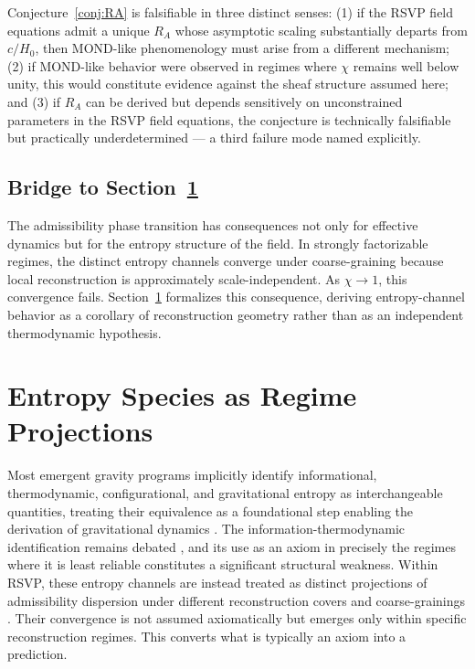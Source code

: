 \documentclass[11pt, a4paper]{article}
\theoremstyle{plain}
\theoremstyle{definition}
\theoremstyle{remark}
\newcommand{\RA}{R_{\!A}}
\begin{document}
Conjecture~\ref{conj:RA} is falsifiable in three distinct senses: (1) if the RSVP
field equations admit a unique $\RA$ whose asymptotic scaling substantially departs
from $c/H_0$, then MOND-like phenomenology must arise from a different mechanism;
(2) if MOND-like behavior were observed in regimes where $\chi$ remains well below
unity, this would constitute evidence against the sheaf structure assumed here; and
(3) if $\RA$ can be derived but depends sensitively on unconstrained parameters in
the RSVP field equations, the conjecture is technically falsifiable but practically
underdetermined --- a third failure mode named explicitly.

\subsection{Bridge to Section~\ref{sec:entropy}}

The admissibility phase transition has consequences not only for effective dynamics
but for the entropy structure of the field. In strongly factorizable regimes, the
distinct entropy channels converge under coarse-graining because local reconstruction
is approximately scale-independent. As $\chi \to 1$, this convergence fails.
Section~\ref{sec:entropy} formalizes this consequence, deriving entropy-channel
behavior as a corollary of reconstruction geometry rather than as an independent
thermodynamic hypothesis.

\section{Entropy Species as Regime Projections}
\label{sec:entropy}

Most emergent gravity programs implicitly identify informational, thermodynamic,
configurational, and gravitational entropy as interchangeable quantities, treating
their equivalence as a foundational step enabling the derivation of gravitational
dynamics \cite{verlinde2011,kastner2024}. The information-thermodynamic
identification remains debated \cite{jaynes1957}, and its use as an axiom in
precisely the regimes where it is least reliable constitutes a significant structural
weakness. Within RSVP, these entropy channels are instead treated as distinct
projections of admissibility dispersion under different reconstruction covers and
coarse-grainings \cite{amari2016}. Their convergence is not assumed axiomatically
but emerges only within specific reconstruction regimes. This converts what is
typically an axiom into a prediction.
\end{document}
